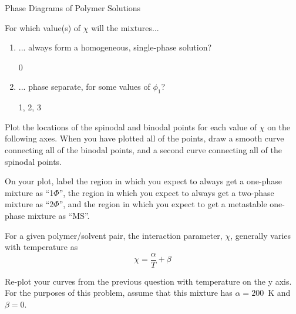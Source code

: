 \begin{activity}{Phase Diagrams of Polymer Solutions}
\begin{ctqs}
	\question For which value(s) of $\chi$ will the mixtures...
	
		\begin{enumerate}
			\item ... always form a homogeneous, single-phase solution?
				
				\begin{solution}[0.75in]
					0
				\end{solution}
			
			\item ... phase separate, for some values of $\phi_1$?
				\begin{solution}[0.75in]
					1, 2, 3
				\end{solution}
		\end{enumerate}
		
	\question Plot the locations of the spinodal and binodal points for each value of $\chi$ on the following axes.  When you have plotted all of the points, draw a smooth curve connecting all of the binodal points, and a second curve connecting all of the spinodal points.
	
		\begin{solution}[2in]
		\end{solution}
		
	\question On your plot, label the region in which you expect to always get a one-phase mixture as ``1$\Phi$'', the region in which you expect to always get a two-phase mixture as ``2$\Phi$'', and the region in which you expect to get a metastable one-phase mixture as ``MS''.
		
\end{ctqs}


\begin{infobox}
	For a given polymer/solvent pair, the interaction parameter, $\chi$, generally varies with temperature as
	\begin{equation*}
		\chi = \frac{\alpha}{T} + \beta
	\end{equation*}
\end{infobox}


\begin{ctqs}

	\question Re-plot your curves from the previous question with temperature on the y axis.  For the purposes of this problem, assume that this mixture has $\alpha=200$~K and $\beta=0$.
		\label{\labelbase:ctq:plotT}
	

\end{ctqs}
\end{activity}
